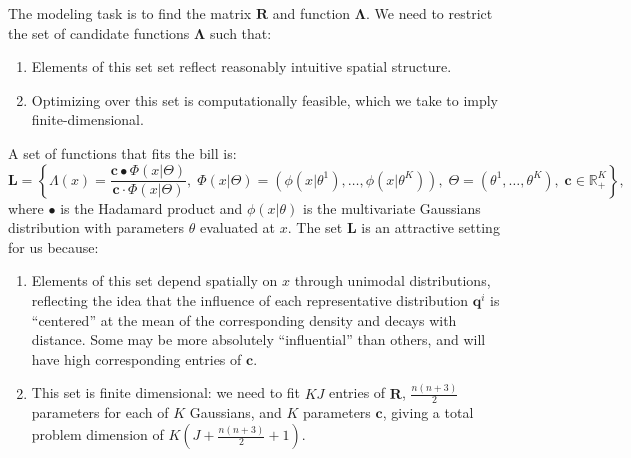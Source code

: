 \documentclass[english]{scrartcl}
\newcommand\R[0]{\mathbb{R}}
\begin{document}
		The modeling task is to find the matrix $\mathbf{R}$ and function $\mathbf{\Lambda}$. We need to restrict the set of candidate functions $\mathbf{\Lambda}$ such that: 
		\begin{enumerate}
		 	\item Elements of this set set reflect reasonably intuitive spatial structure. 
		 	\item Optimizing over this set is computationally feasible, which we take to imply finite-dimensional. 
		\end{enumerate} 
		A set of functions that fits the bill is: 
		\begin{equation}
			\mathbf{L} = \left\{ \Lambda(x) = \frac{\mathbf{c} \bullet \Phi(x|\Theta)}{\mathbf{c} \cdot \Phi(x|\Theta)},\; \Phi(x|\Theta) = (\phi(x|\theta^1),\ldots, \phi(x|\theta^K)),\; \Theta = (\theta^1,\ldots,\theta^K), \; \mathbf{c}\in \R^K_+ \right\},
		\end{equation}
		where $\bullet$ is the Hadamard product and $\phi(x|\theta)$ is the multivariate Gaussians distribution with parameters $\theta$ evaluated at $x$. The set $\mathbf{L}$ is an attractive setting for us because:
		\begin{enumerate}
		 	\item Elements of this set depend spatially on $x$ through unimodal distributions, reflecting the idea that the influence of each representative distribution $\mathbf{q}^i$ is ``centered'' at the mean of the corresponding density and decays with distance. Some may be more absolutely ``influential'' than others, and will have high corresponding entries of $\mathbf{c}$. 
		 	\item This set is finite dimensional: we need to fit $KJ$ entries of $\mathbf{R}$, $\frac{n(n+3)}{2}$ parameters for each of $K$ Gaussians, and $K$ parameters $\mathbf{c}$, giving a total problem dimension of $K\left(J +  \frac{n(n+3)}{2} + 1\right)$. 
		\end{enumerate}
\end{document}
